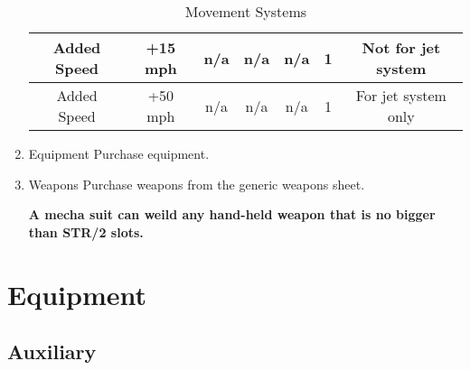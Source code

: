\documentclass[twoside]{book}
\begin{document}
\begin{enumerate}
\begin{table}[htb]
\begin{center}
\begin{tabular}{|c|c|c|c|c|c|c|}
\hline

 Added Speed & +15 mph & n/a & n/a & n/a & 1 & Not for jet system \\

\hline

 Added Speed & +50 mph & n/a & n/a & n/a & 1 & For jet system only \\

\hline


  \end{tabular}
  
\caption{Movement Systems}
  
  \end{center}
\end{table}
    
              
  \item   
                Equipment  
                  Purchase equipment.   
              
  \item   
                Weapons  
                    Purchase weapons from the generic weapons
                   sheet. 
                  

 \textbf{ A mecha suit can weild any hand-held weapon that
                   is no bigger than STR/2 slots. }


              
\end{enumerate}
  
    

\section{Equipment}
    
    

\subsection{Auxiliary}
    
    
\end{document}
